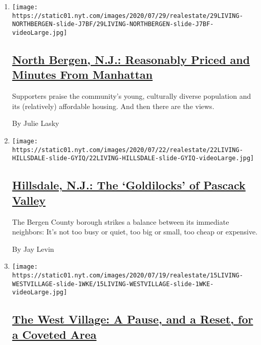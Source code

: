 \begin{enumerate}
\def\labelenumi{\arabic{enumi}.}
\item
  \texttt{[image: https://static01.nyt.com/images/2020/07/29/realestate/29LIVING-NORTHBERGEN-slide-J7BF/29LIVING-NORTHBERGEN-slide-J7BF-videoLarge.jpg]}

  \hypertarget{north-bergen-nj-reasonably-priced-and-minutes-from-manhattan}{%
  \subsection{\texorpdfstring{\href{/2020/07/29/realestate/north-bergen-nj-reasonably-priced-and-minutes-from-manhattan.html}{North
  Bergen, N.J.: Reasonably Priced and Minutes From
  Manhattan}}{North Bergen, N.J.: Reasonably Priced and Minutes From Manhattan}}\label{north-bergen-nj-reasonably-priced-and-minutes-from-manhattan}}

  Supporters praise the community's young, culturally diverse population
  and its (relatively) affordable housing. And then there are the views.

  By Julie Lasky
\item
  \texttt{[image: https://static01.nyt.com/images/2020/07/22/realestate/22LIVING-HILLSDALE-slide-GYIQ/22LIVING-HILLSDALE-slide-GYIQ-videoLarge.jpg]}

  \hypertarget{hillsdale-nj-the-goldilocks-of-pascack-valley}{%
  \subsection{\texorpdfstring{\href{/2020/07/22/realestate/hillsdale-nj-pascack-valley.html}{Hillsdale,
  N.J.: The `Goldilocks' of Pascack
  Valley}}{Hillsdale, N.J.: The `Goldilocks' of Pascack Valley}}\label{hillsdale-nj-the-goldilocks-of-pascack-valley}}

  The Bergen County borough strikes a balance between its immediate
  neighbors: It's not too busy or quiet, too big or small, too cheap or
  expensive.

  By Jay Levin
\item
  \texttt{[image: https://static01.nyt.com/images/2020/07/19/realestate/15LIVING-WESTVILLAGE-slide-1WKE/15LIVING-WESTVILLAGE-slide-1WKE-videoLarge.jpg]}

  \hypertarget{the-west-village-a-pause-and-a-reset-for-a-coveted-area}{%
  \subsection{\texorpdfstring{\href{/2020/07/15/realestate/west-village-nyc.html}{The
  West Village: A Pause, and a Reset, for a Coveted
  Area}}{The West Village: A Pause, and a Reset, for a Coveted Area}}\label{the-west-village-a-pause-and-a-reset-for-a-coveted-area}}


\end{enumerate}
